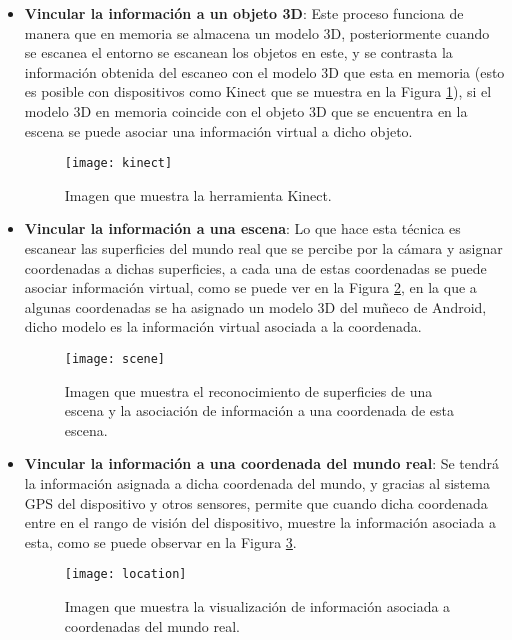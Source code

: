\begin{itemize}
  \item \textbf{Vincular la información a un objeto 3D}: Este proceso funciona de manera que en memoria se almacena un modelo 3D, posteriormente cuando se escanea el entorno se escanean los objetos en este, y se contrasta la información obtenida del escaneo con el modelo 3D que esta en memoria (esto es posible con dispositivos como Kinect que se muestra en la Figura \ref{figura-kinect}), si el modelo 3D en memoria coincide con el objeto 3D que se encuentra en la escena se puede asociar una información virtual a dicho objeto.

  \begin{figure}[h]
    \centering
    \texttt{[image: kinect]}
    \caption{Imagen que muestra la herramienta Kinect.\protect\footnotemark}
    \label{figura-kinect}
  \end{figure}


  \item \textbf{Vincular la información a una escena}:  Lo que hace esta técnica es escanear las superficies del mundo real que se percibe por la cámara y asignar coordenadas a dichas superficies, a cada una de estas coordenadas se puede asociar información virtual, como se puede ver en la Figura \ref{figura-scene}, en la que a algunas coordenadas se ha asignado un modelo 3D del muñeco de Android, dicho modelo es la información virtual asociada a la coordenada.

  \begin{figure}[h]
    \centering
    \texttt{[image: scene]}
    \caption{Imagen que muestra el reconocimiento de superficies de una escena y la asociación de información a una coordenada de esta escena.\protect\footnotemark}
    \label{figura-scene}
  \end{figure}


  \item \textbf{Vincular la información a una coordenada del mundo real}: Se tendrá la información asignada a dicha coordenada del mundo, y gracias al sistema GPS del dispositivo y otros sensores, permite que cuando dicha coordenada entre en el rango de visión del dispositivo, muestre la información asociada a esta, como se puede observar en la Figura \ref{figura-location}.

  \begin{figure}[h]
    \centering
    \texttt{[image: location]}
    \caption{Imagen que muestra la visualización de información asociada a coordenadas del mundo real.\protect\footnotemark}
    \label{figura-location}
  \end{figure}


\end{itemize}

